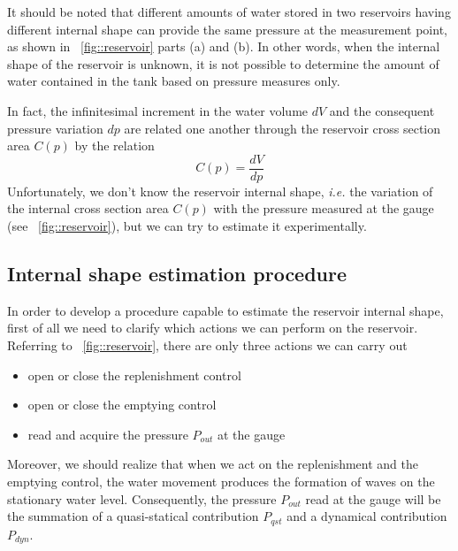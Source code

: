 \documentclass[journal]{IEEEtran}
\begin{document}
It should be noted that different amounts of water stored in two reservoirs having different internal shape can provide the same pressure at the measurement point, as shown in \figurename~\ref{fig::reservoir} parts (a) and (b). In other words, when the internal shape of the reservoir is unknown, it is not possible to determine the amount of water contained in the tank based on pressure measures only.

In fact, the infinitesimal increment in the water volume $dV$ and the consequent pressure variation $dp$ are related one another through the reservoir cross section area $C(p)$ by the relation 
\begin{equation}
C(p)=\frac{dV}{dp}
\label{eq::cp}
\end{equation}
Unfortunately, we don't know the reservoir internal shape, \textit{i.e.} the variation of the internal cross section area $C(p)$ with the pressure measured at the gauge (see \figurename~\ref{fig::reservoir}),
but we can try to estimate it experimentally.
\subsection{Internal shape estimation procedure}
In order to develop a procedure capable to estimate the reservoir internal shape, first of all we need to clarify which actions we can perform on the reservoir. Referring to \figurename~\ref{fig::reservoir}, there are only three actions we can carry out
\begin{itemize}
\item open or close the replenishment control
\item open or close the emptying control
\item read and acquire the pressure $P_{out}$ at the gauge
\end{itemize}
Moreover, we should realize that when we act on the replenishment and the emptying control, the water movement produces the formation of waves on the stationary water level.  
Consequently, the pressure $P_{out}$ read at the gauge will be the summation of a quasi-statical contribution $P_{qst}$ and a dynamical contribution $P_{dyn}$.
\end{document}

